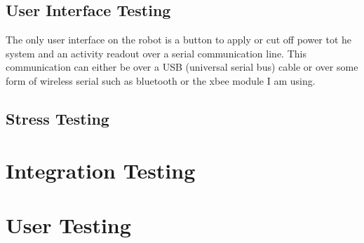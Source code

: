 \subsection{User Interface Testing}
The only user interface on the robot is a button to apply or cut off power tot he system and an activity readout over a serial communication line.  This communication can either be over a USB (universal serial bus) cable or over some form of wireless serial such as bluetooth or the xbee module I am using.
\subsection{Stress Testing}

\section{Integration Testing}

\section{User Testing}
